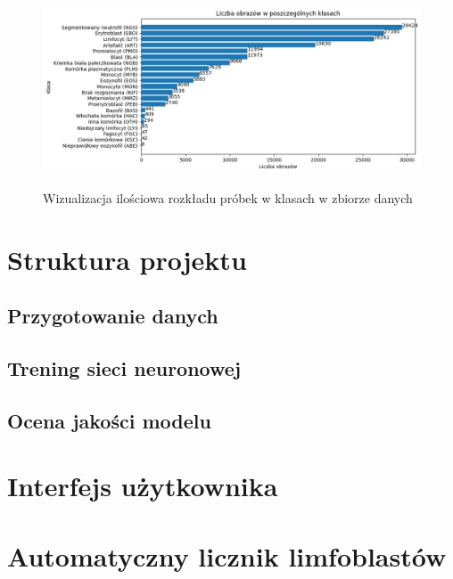 \begin{figure}
    \includegraphics[width=\textwidth]{images_count}\label{fig:images_count_vis}
    \caption{Wizualizacja ilościowa rozkładu próbek w klasach w zbiorze danych}
\end{figure}



\section{Struktura projektu}

\subsection{Przygotowanie danych}

\subsection{Trening sieci neuronowej}

\subsection{Ocena jakości modelu}


\section{Interfejs użytkownika}


\section{Automatyczny licznik limfoblastów}\label{sec:automatyczny-licznik-limfoblastow}

